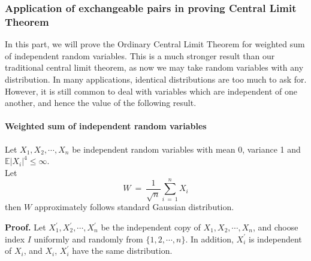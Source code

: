\documentclass[12pt]{article}
\newcommand{\eq }{\: = \:}
\theoremstyle{nonumberplain}
\begin{document}
\medskip
\noindent

\subsubsection{Application of exchangeable pairs in proving Central Limit Theorem}
In this part, we will prove the Ordinary Central Limit Theorem for weighted sum of independent random variables. This is a much stronger result than our traditional central limit theorem, as now we may take random variables with any distribution. In many applications, identical distributions are too much to ask for. However, it is still common to deal with variables which are independent of one another, and hence the value of the following result.

\paragraph{Weighted sum of independent random variables} 

Let $X_{1}, X_{2}, \cdots, X_{n}$ be independent random variables with mean 0, variance 1 and $\mathbb{E}|X_{i}|^{4}\leq \infty$.\\
Let 
$$
W\eq \frac{1}{\sqrt{n}} \sum_{i\eq 1}^{n} X_{i}
$$
then $W$ approximately follows standard Gaussian distribution.

\noindent
\textbf{Proof.} Let $X_{1}^{\prime}, X_{2}^{\prime}, \cdots, X_{n}^{\prime}$ be the independent copy of $X_{1}, X_{2}, \cdots, X_{n}$, and choose index $I$ uniformly and randomly from $\{1,2,\cdots,n\}$. In addition, $X_{i}^{\prime}$ is independent of $X_{i}$, and $X_{i}$, $X_{i}^{\prime}$ have the same distribution. 
\end{document}
